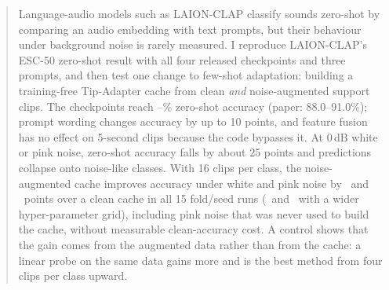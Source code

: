 \begin{abstract}
\noindent
Language-audio models such as LAION-CLAP classify sounds zero-shot by comparing an audio embedding with text prompts, but their behaviour under background noise is rarely measured.
I reproduce LAION-CLAP's ESC-50 zero-shot result with all four released checkpoints and three prompts, and then test one change to few-shot adaptation:
building a training-free Tip-Adapter cache from clean \emph{and} noise-augmented support clips.
The checkpoints reach \repaudiosetfusionA--\repaudiosetA\% zero-shot accuracy (paper: 88.0--91.0\%); prompt wording changes accuracy by up to 10 points, and feature fusion has no effect on 5-second clips because the code bypasses it.
At 0\,dB white or pink noise, zero-shot accuracy falls by about 25 points and predictions collapse onto noise-like classes.
With 16 clips per class, the noise-augmented cache improves accuracy under white and pink noise by \dtipaugvstipcleanKsixteenwhite\ and \dtipaugvstipcleanKsixteenpink\ points over a clean cache in all 15 fold/seed runs (\extdtipaugvstipcleanKsixteenwhite\ and \extdtipaugvstipcleanKsixteenpink\ with a wider hyper-parameter grid), including pink noise that was never used to build the cache, without measurable clean-accuracy cost.
A control shows that the gain comes from the augmented data rather than from the cache: a linear probe on the same data gains more and is the best method from four clips per class upward.
\end{abstract}

